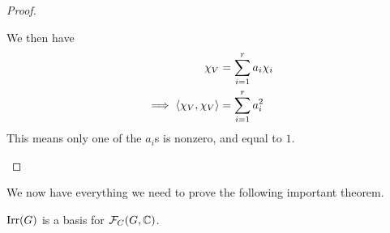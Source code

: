 \begin{proof}
\begin{enumerate}[label = \normalfont \arabic*.]
\begin{description}
            We then have
            \begin{align*}
                \chi_V &= \sum_{i=1}^{r} a_i \chi_i \\
                \implies \left\langle \chi_V, \chi_V \right\rangle &= \sum_{i=1}^{r} a_i^2
            \end{align*}
            This means only one of the $a_i$s is nonzero, and equal to $1$. %
        \end{description}
    \end{enumerate}
\end{proof}

We now have everything we need to prove the following important theorem.

\begin{boxtheorem}
    $\operatorname{Irr}\!\left( G \right)$ is a basis for $\mathcal{F}_C\!\left( G, \mathbb{C} \right)$.
\end{boxtheorem}

